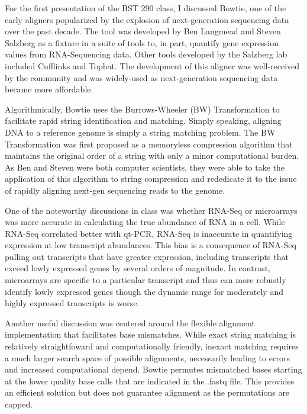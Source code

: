 \documentclass[12pt]{article}
\begin{document}
\begin{addmargin}[6.5mm]{4mm}  
For the first presentation of the BST 290 class, I discussed Bowtie, one of the early aligners popularized by the explosion of next-generation sequencing data over the past decade. The tool was developed by Ben Langmead and Steven Salzberg as a fixture in a suite of tools to, in part, quantify gene expression values from RNA-Sequencing data. Other tools developed by the Salzberg lab included Cufflinks and Tophat. The development of this aligner was well-received by the community and was widely-used as next-generation sequencing data became more affordable. \newline

Algorithmically, Bowtie uses the Burrows-Wheeler (BW) Transformation to facilitate rapid string identification and matching. Simply speaking, aligning DNA to a reference genome is simply a string matching problem. The BW Transformation was first proposed as a memoryless compression algorithm that maintains the original order of a string with only a minor computational burden. As Ben and Steven were both computer scientists, they were able to take the application of this algorithm to string compression and rededicate it to the issue of rapidly aligning next-gen sequencing reads to the genome. \newline

One of the noteworthy discussions in class was whether RNA-Seq or microarrays was more accurate in calculating the true abundance of RNA in a cell. While RNA-Seq correlated better with qt-PCR, RNA-Seq is inaccurate in quantifying expression at low transcript abundances. This bias is a consequence of RNA-Seq pulling out transcripts that have greater expression, including transcripts that exceed lowly expressed genes by several orders of magnitude. In contrast, microarrays are specific to a particular transcript and thus can more robustly identify lowly expressed genes though the dynamic range for moderately and highly expressed transcripts is worse. \newline

Another useful discussion was centered around the flexible alignment implementation that facilitates base mismatches. While exact string matching is relatively straightfoward and computationally friendly, inexact matching requires a much larger search space of possible alignments, necessarily leading to errors and increased computational depend. Bowtie permutes mismatched bases starting at the lower quality base calls that are indicated in the .fastq file. This provides an efficient solution but does not guarantee alignment as the permutations are capped. \newline


\end{addmargin}
\end{document}
